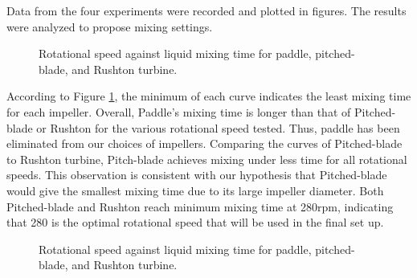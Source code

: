 Data from the four experiments were recorded and plotted in figures. The results were analyzed to propose mixing settings.

\begin{figure}[h] %
	\centering
	\caption{Rotational speed against liquid mixing time for paddle, pitched-blade, and Rushton turbine.}
	\label{fig:RotationalSpeed-MixingTime}
\end{figure}
According to Figure \ref{fig:RotationalSpeed-MixingTime}, the minimum of each curve indicates the least mixing time for each impeller. Overall, Paddle’s mixing time is longer than that of Pitched-blade or Rushton for the various rotational speed tested. Thus, paddle has been eliminated from our choices of impellers. Comparing the curves of Pitched-blade to Rushton turbine, Pitch-blade achieves mixing under less time for all rotational speeds. This observation is consistent with our hypothesis that Pitched-blade would give the smallest mixing time due to its large impeller diameter. Both Pitched-blade and Rushton reach minimum mixing time at 280rpm, indicating that 280 is the optimal rotational speed that will be used in the final set up.

\begin{figure}[h] %
	\centering
	\caption{Rotational speed against liquid mixing time for paddle, pitched-blade, and Rushton turbine.}
	\label{fig:Rushton-comparison}
\end{figure}


